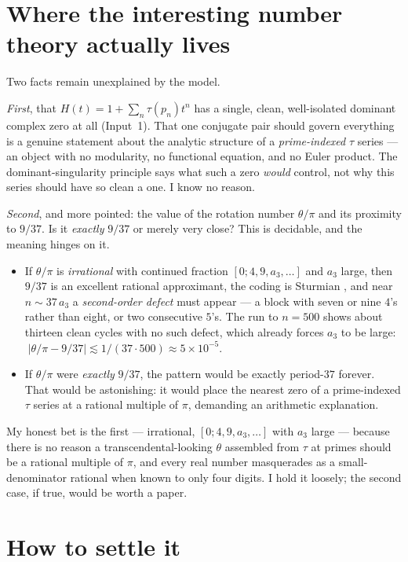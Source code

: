 \documentclass[11pt]{amsart}
\begin{document}
\section{Where the interesting number theory actually lives}

Two facts remain unexplained by the model.

\emph{First}, that $H(t)=1+\sum_n\tau(p_n)t^n$ has a single, clean, well-isolated dominant
complex zero at all (Input~1). That one conjugate pair should govern everything is a genuine
statement about the analytic structure of a \emph{prime-indexed} $\tau$ series --- an object
with no modularity, no functional equation, and no Euler product. The dominant-singularity
principle \cite{FlajoletOdlyzko1990,FlajoletSedgewick2009} says what such a zero \emph{would}
control, not why this series should have so clean a one. I know no reason.

\emph{Second}, and more pointed: the value of the rotation number $\theta/\pi$ and its
proximity to $9/37$. Is it \emph{exactly} $9/37$ or merely very close? This is decidable, and
the meaning hinges on it.
\begin{itemize}
\item If $\theta/\pi$ is \emph{irrational} with continued fraction $[0;4,9,a_3,\dots]$ and
$a_3$ large, then $9/37$ is an excellent rational approximant, the coding is Sturmian
\cite{MorseHedlund1940,Lothaire2002}, and near $n\sim 37\,a_3$ a \emph{second-order defect}
must appear --- a block with seven or nine $4$'s rather than eight, or two consecutive $5$'s.
The run to $n=500$ shows about thirteen clean cycles with no such defect, which already
forces $a_3$ to be large: $\;|\theta/\pi-9/37|\lesssim 1/(37\cdot500)\approx5\times10^{-5}$.
\item If $\theta/\pi$ were \emph{exactly} $9/37$, the pattern would be exactly period-$37$
forever. That would be astonishing: it would place the nearest zero of a prime-indexed
$\tau$ series at a rational multiple of $\pi$, demanding an arithmetic explanation.
\end{itemize}
My honest bet is the first --- irrational, $[0;4,9,a_3,\dots]$ with $a_3$ large --- because
there is no reason a transcendental-looking $\theta$ assembled from $\tau$ at primes should
be a rational multiple of $\pi$, and every real number masquerades as a small-denominator
rational when known to only four digits. I hold it loosely; the second case, if true, would
be worth a paper.

\section{How to settle it}
\end{document}
